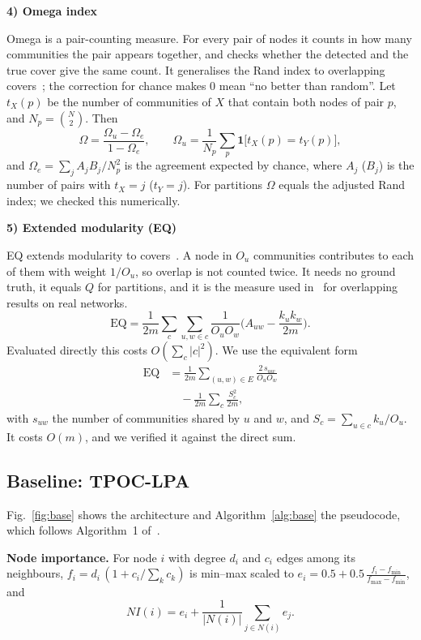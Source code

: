 \documentclass[conference]{IEEEtran}
\newcommand{\metrichead}[1]{\par\smallskip\noindent\textbf{#1}\par\nobreak\vspace{1pt}}
\begin{document}
\metrichead{4) Omega index}
Omega is a pair-counting measure. For every pair of nodes it counts in how many communities the pair appears together, and checks whether the detected and the true cover give the same count. It generalises the Rand index to overlapping covers~\cite{collins1988}; the correction for chance makes 0 mean ``no better than random''. Let $t_X(p)$ be the number of communities of $X$ that contain both nodes of pair $p$, and $N_p=\binom N2$. Then
\begin{equation}
\Omega=\frac{\Omega_u-\Omega_e}{1-\Omega_e},\qquad\Omega_u=\frac1{N_p}\sum_p\mathbf 1\big[t_X(p)=t_Y(p)\big],\label{eq:omega}
\end{equation}
and $\Omega_e=\sum_jA_jB_j/N_p^2$ is the agreement expected by chance, where $A_j$ ($B_j$) is the number of pairs with $t_X=j$ ($t_Y=j$). For partitions $\Omega$ equals the adjusted Rand index; we checked this numerically.

\metrichead{5) Extended modularity (EQ)}
EQ extends modularity to covers~\cite{shen2009}. A node in $O_u$ communities contributes to each of them with weight $1/O_u$, so overlap is not counted twice. It needs no ground truth, it equals $Q$ for partitions, and it is the measure used in~\cite{kong2026} for overlapping results on real networks.
\begin{equation}
\mathrm{EQ}=\frac1{2m}\sum_c\sum_{u,w\in c}\frac{1}{O_uO_w}\Big(A_{uw}-\frac{k_uk_w}{2m}\Big).\label{eq:eq}
\end{equation}
Evaluated directly this costs $O(\sum_c|c|^2)$. We use the equivalent form
\begin{equation}
\begin{split}
\mathrm{EQ}&=\frac1{2m}\sum_{(u,w)\in E}\frac{2\,s_{uw}}{O_uO_w}\\
&\quad-\frac1{2m}\sum_c\frac{S_c^{2}}{2m},
\end{split}
\end{equation}
with $s_{uw}$ the number of communities shared by $u$ and $w$, and $S_c=\sum_{u\in c}k_u/O_u$. It costs $O(m)$, and we verified it against the direct sum.

\subsection{Baseline: TPOC-LPA}\label{sec:base}
Fig.~\ref{fig:base} shows the architecture and Algorithm~\ref{alg:base} the pseudocode, which follows Algorithm~1 of~\cite{kong2026}. 

\textbf{Node importance.} For node $i$ with degree $d_i$ and $c_i$ edges among its neighbours, $f_i=d_i\,(1+c_i/\sum_kc_k)$ is min--max scaled to $e_i=0.5+0.5\,\frac{f_i-f_{\min}}{f_{\max}-f_{\min}}$, and
\begin{equation}
NI(i)=e_i+\frac1{|N(i)|}\sum_{j\in N(i)}e_j.\label{eq:ni}
\end{equation}
\end{document}
